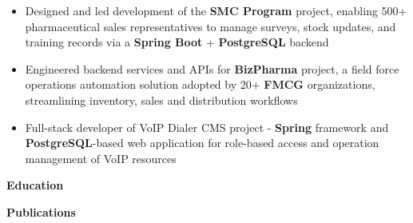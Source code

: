 \documentclass[10pt,a4paper,ragged2e,withhyper]{altacv}
\renewcommand{\cvsectionfont}{\Large\sffamily\bfseries}
\renewcommand{\divider}{\textcolor{PastelRed!50}{\hdashrule{1.015\linewidth}{0.6pt}{0.6ex}}\medskip}
\renewcommand{\cvsection}[2][]{%
  \nointerlineskip\bigskip%
  \ifstrequal{#1}{}{}{\marginpar{\vspace*{\dimexpr1pt-\baselineskip}\raggedright}}%
  {\color{heading}\cvsectionfont{#2}}\\[-1ex]%
  \makebox[0pt][l]{\color{headingrule}\rule{\dimexpr\linewidth+0.25cm}{1pt}}\par\medskip
}
\begin{document}
\begin{paracol}{2}
\begin{itemize}
\item \justifying Designed and led development of the \textbf{SMC Program} project, enabling 500+ pharmaceutical sales representatives to manage surveys, stock updates, and training records via a \textbf{Spring Boot} + \textbf{PostgreSQL} backend
\item \justifying Engineered backend services and APIs for \textbf{BizPharma} project, a field force operations automation solution adopted by 20+ \textbf{FMCG} organizations, streamlining inventory, sales and distribution workflows
\item \justifying Full-stack developer of VoIP Dialer CMS project - \textbf{Spring} framework and  \textbf{PostgreSQL}-based web application for role-based access and operation management of VoIP resources
\end{itemize}

\vspace{2em}

\cvsection{Education}


\divider


\vspace{2em}

\cvsection{Publications}
\begin{justifying}
\nocite{saha2025pseudonymization}
\printbibliography[heading=none]
\end{justifying}

\end{paracol}
\end{document}
